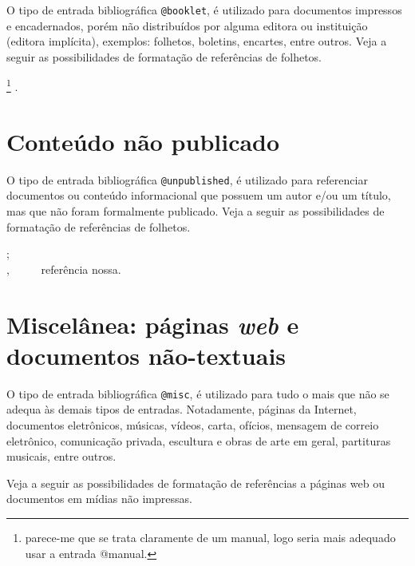 \begin{apendicesenv}
O tipo de entrada bibliográfica \verb|@booklet|, é utilizado para documentos impressos e encadernados, porém não distribuídos por alguma editora ou instituição (editora implícita), exemplos: folhetos, boletins, encartes, entre outros. Veja a seguir as possibilidades de formatação de referências de folhetos.

{\small
    \cite{IBICT1993}\footnote{parece-me que se trata claramente de um manual, logo seria mais adequado usar a entrada {\ttfamily @manual}.} .\\
}



\section{Conteúdo não publicado}
\label{sec:unpublished}

O tipo de entrada bibliográfica \verb|@unpublished|, é utilizado para referenciar documentos ou conteúdo informacional que possuem um autor e/ou um título, mas que não foram formalmente publicado. Veja a seguir as possibilidades de formatação de referências de folhetos.

{\small
    \cite{Accioly} ;\\
    \cite{Oliveira2013}  , \ \ \ \ \ referência nossa.\\
}



\section{Miscelânea: páginas \textit{web} e documentos não-textuais}
\label{sec:misc}


O tipo de entrada bibliográfica \verb|@misc|, é utilizado para tudo o mais que não se adequa às demais tipos de entradas. Notadamente, páginas da Internet, documentos eletrônicos, músicas, vídeos, carta, ofícios, mensagem de correio eletrônico, comunicação privada, escultura e obras de arte em geral, partituras musicais, entre outros.

Veja a seguir as possibilidades de formatação de referências a páginas web ou documentos em mídias não impressas.


\end{apendicesenv}
